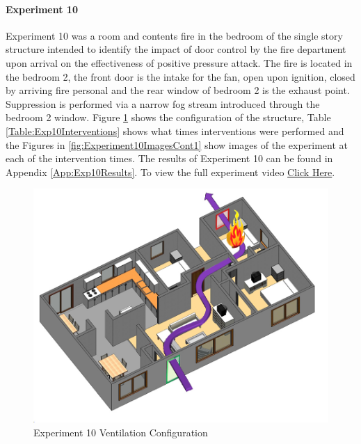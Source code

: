 \documentclass{article}
\begin{document}
\paragraph{Experiment 10}\mbox{}

Experiment 10 was a room and contents fire in the bedroom of the single story structure intended to identify the impact of door control by the fire department upon arrival on the effectiveness of positive pressure attack. The fire is located in the bedroom 2, the front door is the intake for the fan, open upon ignition, closed by arriving fire personal and the rear window of bedroom 2 is the exhaust point. Suppression is performed via a narrow fog stream introduced through the bedroom 2 window. Figure \ref{fig:Exp10VentConfig} shows the configuration of the structure, Table \ref{Table:Exp10Interventions} shows what times interventions were performed and the Figures in \ref{fig:Experiment10ImagesCont1} show images of the experiment at each of the intervention times. The results of Experiment 10 can be found in Appendix \ref{App:Exp10Results}. To view the full experiment video \href{https://youtu.be/e76r4kRpdQg}{Click Here}.

\begin{figure}[H]
	\centering
	\includegraphics[width=5in]{0_Images/FireExperiments/Single_Story/Experiment_10.jpg}
	\caption{Experiment 10 Ventilation Configuration}
	\label{fig:Exp10VentConfig}
\end{figure}
\end{document}
